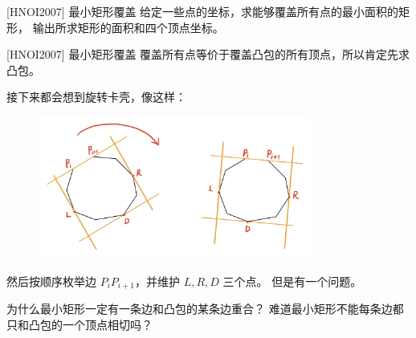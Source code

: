 \documentclass{beamer}
\begin{document}
\begin{frame}{[HNOI2007] 最小矩形覆盖}
    \small
    给定一些点的坐标，求能够覆盖所有点的最小面积的矩形，
    输出所求矩形的面积和四个顶点坐标。
\end{frame}

\begin{frame}{[HNOI2007] 最小矩形覆盖}
    \footnotesize
    覆盖所有点等价于覆盖凸包的所有顶点，所以肯定先求凸包。

    \vspace{1em}\pause
    接下来都会想到旋转卡壳，像这样：
    \begin{figure}[H]
        \centering
        \includegraphics[width=0.8\textwidth]{pic/hnoi2007.jpg}
    \end{figure}
    然后按顺序枚举边 $P_{i}P_{i+1}$，并维护 $L,R,D$ 三个点。
    但是有一个问题。

    \vspace{1em}\pause
    为什么最小矩形一定有一条边和凸包的某条边重合？
    难道最小矩形不能每条边都只和凸包的一个顶点相切吗？
\end{frame}
\end{document}
